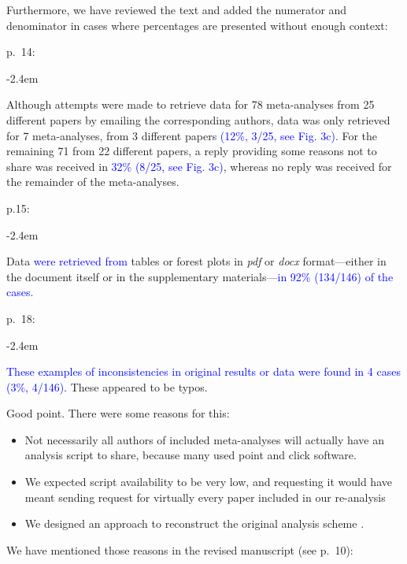 \documentclass[draft]{article}
\renewenvironment{quote}{\begin{fquote}\advance\leftmargini -2.4em\begin{oldquote}}{\end{oldquote}\end{fquote}}
\newenvironment{fquote}
  {\def\FrameCommand{
	\fboxsep=0.6em %
	\fcolorbox{black}{white}}%
    \MakeFramed {\advance\hsize-2\width \FrameRestore}
    \begin{minipage}{\linewidth}
  }
  {\end{minipage}\endMakeFramed}
\begin{document}
Furthermore, we have reviewed the text and added the numerator and denominator in cases where percentages are presented without enough context:

p.~14:

\begin{quote}
Although attempts were made to retrieve data for 78 meta-analyses from 25 different papers by emailing the corresponding authors, data was only retrieved for 7 meta-analyses, from 3 different papers \textcolor{blue}{(12\%, 3/25, see Fig. 3c).} For the remaining 71 from 22 different papers, a reply providing some reasons not to share was received in \textcolor{blue}{32\% (8/25, see Fig. 3c)}, whereas no reply was received for the remainder of the meta-analyses.
\end{quote}

p.15:

\begin{quote}
Data \textcolor{blue}{were retrieved from} tables or forest plots in \emph{pdf} or \emph{docx} format---either in the document itself or in the supplementary materials---\textcolor{blue}{in 92\% (134/146) of the cases.}
\end{quote}

p.~18:

\begin{quote}
\textcolor{blue}{These examples of inconsistencies in original results or data were found in 4 cases (3\%, 4/146).} These appeared to be typos.
\end{quote}


Good point. There were some reasons for this:

\begin{itemize}
\item
  Not necessarily all authors of included meta-analyses will actually have an analysis script to share, because many used point and click software.
\item
  We expected script availability to be very low, and requesting it would have meant sending request for virtually every paper included in our re-analysis
\item
  We designed an approach to reconstruct the original analysis scheme .
\end{itemize}

We have mentioned those reasons in the revised manuscript (see p.~10):
\end{document}
